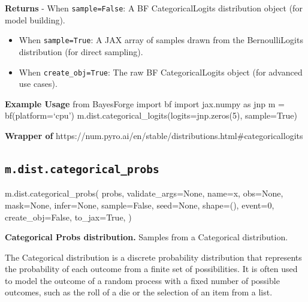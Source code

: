 \documentclass[
  letterpaper,
  DIV=11,
  numbers=noendperiod]{scrartcl}
\newenvironment{Shaded}{\begin{snugshade}}{\end{snugshade}}
\newcommand{\DecValTok}[1]{\textcolor[rgb]{0.68,0.00,0.00}{#1}}
\newcommand{\NormalTok}[1]{\textcolor[rgb]{0.00,0.23,0.31}{#1}}
\newcommand{\OperatorTok}[1]{\textcolor[rgb]{0.37,0.37,0.37}{#1}}
\newcommand{\StringTok}[1]{\textcolor[rgb]{0.13,0.47,0.30}{#1}}
\newcommand{\VariableTok}[1]{\textcolor[rgb]{0.07,0.07,0.07}{#1}}
\begin{document}
\textbf{Returns} - When \texttt{sample=False}: A BF CategoricalLogits
distribution object (for model building).

\begin{itemize}
\item
  When \texttt{sample=True}: A JAX array of samples drawn from the
  BernoulliLogits distribution (for direct sampling).
\item
  When \texttt{create\_obj=True}: The raw BF CategoricalLogits object
  (for advanced use cases).
\end{itemize}

\textbf{Example Usage} from BayesForge import bf import jax.numpy as jnp
m = bf(platform=`cpu') m.dist.categorical\_logits(logits=jnp.zeros(5),
sample=True)

\textbf{Wrapper of}
https://num.pyro.ai/en/stable/distributions.html\#categoricallogits

\subsection{\texorpdfstring{\texttt{m.dist.categorical\_probs}}{m.dist.categorical\_probs}}\label{categorical_probs}

\begin{Shaded}
\begin{Highlighting}[]
\NormalTok{m.dist.categorical\_probs(}
\NormalTok{    probs,}
\NormalTok{    validate\_args}\OperatorTok{=}\VariableTok{None}\NormalTok{,}
\NormalTok{    name}\OperatorTok{=}\StringTok{\textquotesingle{}x\textquotesingle{}}\NormalTok{,}
\NormalTok{    obs}\OperatorTok{=}\VariableTok{None}\NormalTok{,}
\NormalTok{    mask}\OperatorTok{=}\VariableTok{None}\NormalTok{,}
\NormalTok{    infer}\OperatorTok{=}\VariableTok{None}\NormalTok{,}
\NormalTok{    sample}\OperatorTok{=}\VariableTok{False}\NormalTok{,}
\NormalTok{    seed}\OperatorTok{=}\VariableTok{None}\NormalTok{,}
\NormalTok{    shape}\OperatorTok{=}\NormalTok{(),}
\NormalTok{    event}\OperatorTok{=}\DecValTok{0}\NormalTok{,}
\NormalTok{    create\_obj}\OperatorTok{=}\VariableTok{False}\NormalTok{,}
\NormalTok{    to\_jax}\OperatorTok{=}\VariableTok{True}\NormalTok{,}
\NormalTok{)}
\end{Highlighting}
\end{Shaded}

\textbf{Categorical Probs distribution.} Samples from a Categorical
distribution.

The Categorical distribution is a discrete probability distribution that
represents the probability of each outcome from a finite set of
possibilities. It is often used to model the outcome of a random process
with a fixed number of possible outcomes, such as the roll of a die or
the selection of an item from a list.
\end{document}
